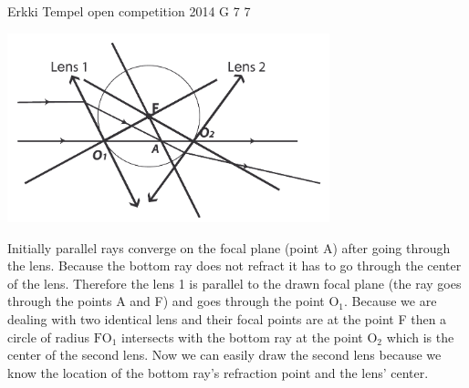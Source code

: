 \documentclass[11pt]{article}
\begin{document}
{Erkki Tempel} %
{open competition} %
{2014} %
{G 7} %
{7} %
{

\ifEngSolution
\begin{center}
\includegraphics[width=0.7\textwidth]{2014-lahg-07-optilineskeemlahendus_ing}
\end{center}
Initially parallel rays converge on the focal plane (point A) after going through the lens. Because the bottom ray does not refract it has to go through the center of the lens. Therefore the lens 1 is parallel to the drawn focal plane (the ray goes through the points A and F) and goes through the point $\text{O}_1$. Because we are dealing with two identical lens and their focal points are at the point F then a circle of radius $\text{FO}_1$ intersects with the bottom ray at the point $\text{O}_2$ which is the center of the second lens. Now we can easily draw the second lens because we know the location of the bottom ray’s refraction point and the lens’ center.
\fi
}
\end{document}

